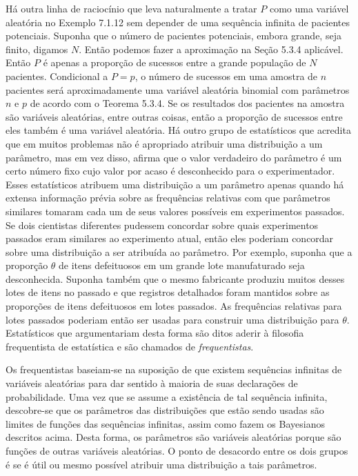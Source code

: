 \vspace{0.5cm}
Há outra linha de raciocínio que leva naturalmente a tratar $P$ como uma variável aleatória no Exemplo 7.1.12 sem depender de uma sequência infinita de pacientes potenciais. Suponha que o número de pacientes potenciais, embora grande, seja finito, digamos $N$. Então podemos fazer a aproximação na Seção 5.3.4 aplicável. Então $P$ é apenas a proporção de sucessos entre a grande população de $N$ pacientes. Condicional a $P=p$, o número de sucessos em uma amostra de $n$ pacientes será aproximadamente uma variável aleatória binomial com parâmetros $n$ e $p$ de acordo com o Teorema 5.3.4. Se os resultados dos pacientes na amostra são variáveis aleatórias, entre outras coisas, então a proporção de sucessos entre eles também é uma variável aleatória.
Há outro grupo de estatísticos que acredita que em muitos problemas não é apropriado atribuir uma distribuição a um parâmetro, mas em vez disso, afirma que o valor verdadeiro do parâmetro é um certo número fixo cujo valor por acaso é desconhecido para o experimentador. Esses estatísticos atribuem uma distribuição a um parâmetro apenas quando há extensa informação prévia sobre as frequências relativas com que parâmetros similares tomaram cada um de seus valores possíveis em experimentos passados. Se dois cientistas diferentes pudessem concordar sobre quais experimentos passados eram similares ao experimento atual, então eles poderiam concordar sobre uma distribuição a ser atribuída ao parâmetro. Por exemplo, suponha que a proporção $\theta$ de itens defeituosos em um grande lote manufaturado seja desconhecida. Suponha também que o mesmo fabricante produziu muitos desses lotes de itens no passado e que registros detalhados foram mantidos sobre as proporções de itens defeituosos em lotes passados. As frequências relativas para lotes passados poderiam então ser usadas para construir uma distribuição para $\theta$. Estatísticos que argumentariam desta forma são ditos aderir à filosofia frequentista de estatística e são chamados de \textit{frequentistas}.

\vspace{0.5cm}
Os frequentistas baseiam-se na suposição de que existem sequências infinitas de variáveis aleatórias para dar sentido à maioria de suas declarações de probabilidade. Uma vez que se assume a existência de tal sequência infinita, descobre-se que os parâmetros das distribuições que estão sendo usadas são limites de funções das sequências infinitas, assim como fazem os Bayesianos descritos acima. Desta forma, os parâmetros são variáveis aleatórias porque são funções de outras variáveis aleatórias. O ponto de desacordo entre os dois grupos é se é útil ou mesmo possível atribuir uma distribuição a tais parâmetros.

